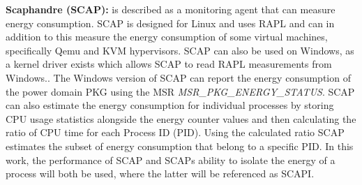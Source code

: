 \noindent\textbf{Scaphandre (SCAP):} is described as a monitoring agent that can measure energy consumption.\cite{scaphandre} SCAP is designed for Linux and uses RAPL and can in addition to this measure the energy consumption of some virtual machines, specifically Qemu and KVM hypervisors. SCAP can also be used on Windows, as a kernel driver exists which allows SCAP to read RAPL measurements from Windows.\cite{RAPL_Windows}. %
The Windows version of SCAP can report the energy consumption of the power domain PKG using the MSR \textit{MSR\_PKG\_ENERGY\_STATUS}. SCAP can also estimate the energy consumption for individual processes by storing CPU usage statistics alongside the energy counter values and then calculating the ratio of CPU time for each Process ID (PID). Using the calculated ratio SCAP estimates the subset of energy consumption that belong to a specific PID. In this work, the performance of SCAP and SCAPs ability to isolate the energy of a process will both be used, where the latter will be referenced as SCAPI.

